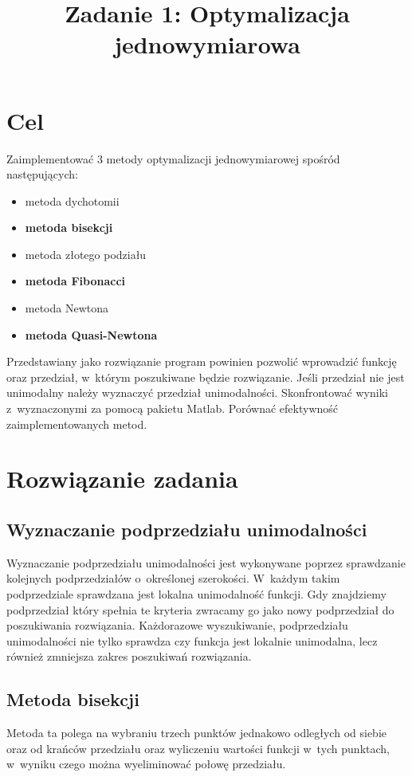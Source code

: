\documentclass{classrep}
\author{
  \studentinfo{Paweł Musiał}{nr albumu 1} \and
  \studentinfo{Łukasz Michalski}{178724}
}
\title{Zadanie 1: Optymalizacja jednowymiarowa} %
\begin{document}
\maketitle


\addtocounter{footnote}{1}

\section{Cel}
Zaimplementować 3 metody optymalizacji jednowymiarowej spośród następujących:
\begin{itemize}
	\item	metoda dychotomii
	\item	\textbf{metoda bisekcji}
	\item	metoda złotego podziału
	\item	\textbf{metoda Fibonacci}
	\item	metoda Newtona
	\item	\textbf{metoda Quasi-Newtona}
\end{itemize}

Przedstawiany jako rozwiązanie program powinien pozwolić wprowadzić funkcję oraz przedział, w~którym poszukiwane będzie rozwiązanie. Jeśli przedział nie jest unimodalny należy wyznaczyć przedział unimodalności. Skonfrontować wyniki z~wyznaczonymi za pomocą pakietu Matlab. Porównać efektywność zaimplementowanych metod.

\section{Rozwiązanie zadania}
\subsection{Wyznaczanie podprzedziału unimodalności}

Wyznaczanie podprzedziału unimodalności jest wykonywane poprzez sprawdzanie kolejnych podprzedziałów o~określonej szerokości. W~każdym takim podprzedziale sprawdzana jest lokalna unimodalność funkcji. Gdy znajdziemy podprzedział który spełnia te kryteria zwracamy go jako nowy podprzedział do poszukiwania rozwiązania. Każdorazowe wyszukiwanie, podprzedziału unimodalności nie tylko sprawdza czy funkcja jest lokalnie unimodalna, lecz również zmniejsza zakres poszukiwań rozwiązania.

\subsection{Metoda bisekcji \cite{1}}
Metoda ta polega na wybraniu trzech punktów jednakowo odległych od siebie oraz od krańców przedziału oraz wyliczeniu wartości funkcji w~tych punktach, w~wyniku czego można wyeliminować połowę przedziału.\\
\end{document}
